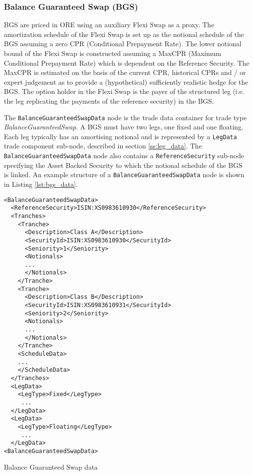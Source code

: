 \subsubsection{Balance Guaranteed Swap (BGS)}

\ifdefined{}\fi

BGS are priced in ORE using an auxiliary Flexi Swap as a proxy. The amortization schedule 
of the Flexi Swap is set up as the notional schedule of the BGS assuming a zero 
CPR (Conditional Prepayment Rate). The lower notional bound of the Flexi Swap is 
constructed assuming a MaxCPR (Maximum Conditional Prepayment Rate) which is 
dependent on the Reference Security. The MaxCPR is estimated on the basis of 
the current CPR, historical CPRs and / or expert judgement as to provide a 
(hypothetical) sufficiently realistic hedge for the BGS. The option holder in 
the Flexi Swap is the payer of the structured leg (i.e. the leg replicating the 
payments of the reference security) in the BGS.

The \lstinline!BalanceGuaranteedSwapData! node is the trade data container for trade type \emph{BalanceGuaranteedSwap}.  A BGS must have two legs, one fixed and one floating. Each leg typically has an amortising notional and is represented by a \lstinline!LegData! trade component sub-node, described in section \ref{ss:leg_data}.
The \lstinline!BalanceGuaranteedSwapData! node also contains a \lstinline!ReferenceSecurity! sub-node specifying the Asset Backed Security to which the notional schedule of the BGS is linked. 
An example structure of a  \lstinline!BalanceGuaranteedSwapData! node is shown in Listing \ref{lst:bgs_data}.
\begin{listing}[H]
\begin{verbatim}
<BalanceGuaranteedSwapData>
  <ReferenceSecurity>ISIN:XS0983610930</ReferenceSecurity>
  <Tranches>
    <Tranche>
      <Description>Class A</Description>
      <SecurityId>ISIN:XS0983610930</SecurityId>
      <Seniority>1</Seniority>
      <Notionals>
      ...
      </Notionals>
    </Tranche>
    <Tranche>
      <Description>Class B</Description>
      <SecurityId>ISIN:XS0983610931</SecurityId>
      <Seniority>2</Seniority>
      <Notionals>
      ...
      </Notionals>
    </Tranche>
    <ScheduleData>
    ...
    </ScheduleData>
  </Tranches>
  <LegData>
	<LegType>Fixed</LegType>
	 ...
  </LegData>
  <LegData>
	<LegType>Floating</LegType>
	 ...
  </LegData>
<BalanceGuaranteedSwapData>
\end{verbatim}
\caption{Balance Guaranteed Swap data}
\label{lst:bgs_data}
\end{listing}

